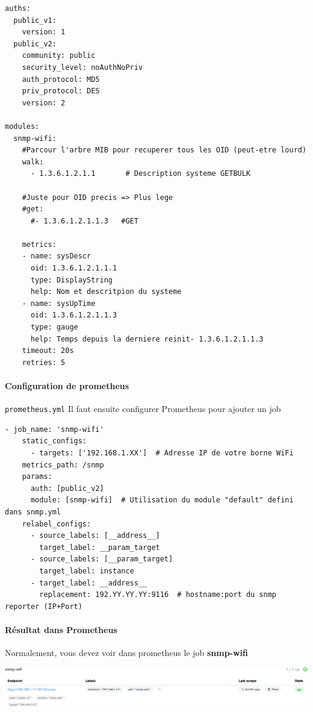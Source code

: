 \documentclass[french, 12pt]{article}%
\begin{document}
\begin{lstlisting}[style=commande] 
auths:
  public_v1:
    version: 1
  public_v2:
    community: public
    security_level: noAuthNoPriv
    auth_protocol: MD5
    priv_protocol: DES
    version: 2

modules:
  snmp-wifi:
    #Parcour l'arbre MIB pour recuperer tous les OID (peut-etre lourd)
    walk:
      - 1.3.6.1.2.1.1       # Description systeme GETBULK
      
    #Juste pour OID precis => Plus lege
    #get:
      #- 1.3.6.1.2.1.1.3   #GET
    
    metrics:
    - name: sysDescr
      oid: 1.3.6.1.2.1.1.1
      type: DisplayString
      help: Nom et descritpion du systeme
    - name: sysUpTime
      oid: 1.3.6.1.2.1.1.3
      type: gauge
      help: Temps depuis la derniere reinit- 1.3.6.1.2.1.1.3  
    timeout: 20s
    retries: 5
\end{lstlisting} 
 
\paragraph{Configuration de prometheus } \verb?prometheus.yml?
Il faut ensuite configurer Prometheus pour ajouter un job 

\begin{lstlisting}[style=commande] 
- job_name: 'snmp-wifi'
    static_configs:
      - targets: ['192.168.1.XX']  # Adresse IP de votre borne WiFi
    metrics_path: /snmp
    params:
      auth: [public_v2]
      module: [snmp-wifi]  # Utilisation du module "default" defini dans snmp.yml
    relabel_configs:
      - source_labels: [__address__]
        target_label: __param_target
      - source_labels: [__param_target]
        target_label: instance
      - target_label: __address__
        replacement: 192.YY.YY.YY:9116  # hostname:port du snmp reporter (IP+Port)
\end{lstlisting} 


\paragraph{Résultat dans Prometheus}
 
Normalement, vous devez voir dans prometheus le job \textbf{snmp-wifi}

\begin{center}
\includegraphics[scale=0.5]{./ressource/snmpWifi}
\end{center}
\end{document}
